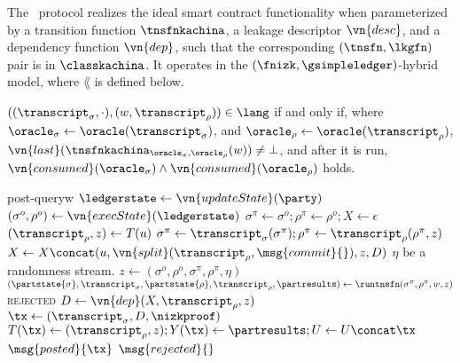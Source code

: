 \begin{protocol}{\kachina}
  The \kachina\ protocol realizes the ideal smart contract functionality when
  parameterized by a transition function $\tnsfnkachina$, a leakage descriptor
  $\vn{desc}$, and a dependency function $\vn{dep}$, such that the corresponding
  $(\tnsfn, \lkgfn)$ pair is in $\classkachina$. It operates in
  the $(\fnizk, \gsimpleledger)$-hybrid model, where $\lang$ is
  defined below.

  $((\transcript_\sigma, \cdot), (w, \transcript_\rho)) \in \lang$ if and only
  if, where $\oracle_\sigma \gets \oracle(\transcript_\sigma)$, and
  $\oracle_\rho \gets \oracle(\transcript_\rho)$,
  $\vn{last}(\tnsfnkachina_{\oracle_\sigma, \oracle_\rho}(w))\allowbreak\neq \bot$, and after it is run,
  $\vn{consumed}(\oracle_\sigma) \land \vn{consumed}(\oracle_\rho)$ holds.

  \begin{statedecl}
  \end{statedecl}

  \begin{receive}{post-query}{w}
    \State \Let $\ledgerstate \gets \vn{updateState}(\party)$
    \State \Let $(\sigma^o, \rho^o) \gets \vn{execState}(\ledgerstate)$
    \State \Let $\sigma^\pi \gets \sigma^o; \rho^\pi \gets \rho^o; X \gets \epsilon$
      \State \Let $(\transcript_\rho, z) \gets T(u)$
      \State \Let $\sigma^\pi \gets \transcript_\sigma(\sigma^\pi); \rho^\pi
        \gets \transcript_\rho(\rho^\pi, z)$
      \State \Let $X \gets X \concat (u, \vn{split}(\transcript_\rho,
        \msg{commit}{}), z, D)$
    \EndFor
    \State \Let $\eta$ be a randomness stream.
    \State \Let $z \gets (\sigma^o, \rho^o, \sigma^\pi, \rho^\pi, \eta)$
    \State \Let $(\partstate{\sigma}, \transcript_\sigma, \partstate{\rho}, \transcript_\rho, \partresults) \gets
      \runtnsfn(\sigma^\pi, \rho^\pi,w, z)$
      \State \Return \textsc{rejected}
    \EndIf
    \State \Let $D \gets \vn{dep}(X, \transcript_\rho, z)$
      \State \Let $\tx \gets (\transcript_\sigma, D, \nizkproof)$
      \State \Let $T(\tx) \gets (\transcript_\rho, z); Y(\tx) \gets \partresults; U \gets U
        \concat \tx$
      \State {}
      \State \Return $\msg{posted}{\tx}$
    \Else
      \State \Return $\msg{rejected}{}$
    \EndIf
  \end{receive}


\end{protocol}
